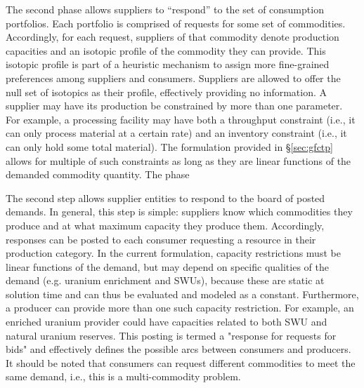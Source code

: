 The second phase allows suppliers to ``respond'' to the set of consumption
portfolios. Each portfolio is comprised of requests for some set of
commodities. Accordingly, for each request, suppliers of that commodity denote
production capacities and an isotopic profile of the commodity they can
provide. This isotopic profile is part of a heuristic mechanism to assign more
fine-grained preferences among suppliers and consumers. Suppliers are allowed to
offer the null set of isotopics as their profile, effectively providing no
information. A supplier may have its production be constrained by more than one
parameter. For example, a processing facility may have both a throughput
constraint (i.e., it can only process material at a certain rate) and an
inventory constraint (i.e., it can only hold some total material). The
formulation provided in \S\ref{sec:gfctp} allows for multiple of such
constraints as long as they are linear functions of the demanded commodity
quantity. The phase

The second step allows supplier entities to respond to the board of posted
demands. In general, this step is simple: suppliers know which commodities they
produce and at what maximum capacity they produce them. Accordingly, responses
can be posted to each consumer requesting a resource in their production
category. In the current formulation, capacity restrictions must be linear
functions of the demand, but may depend on specific qualities of the demand
(e.g. uranium enrichment and SWUs), because these are static at solution time
and can thus be evaluated and modeled as a constant. Furthermore, a producer can
provide more than one such capacity restriction. For example, an enriched
uranium provider could have capacities related to both SWU and natural uranium
reserves. This posting is termed a "response for requests for bids" and
effectively defines the possible arcs between consumers and producers. It should
be noted that consumers can request different commodities to meet the same
demand, i.e., this is a multi-commodity problem.

